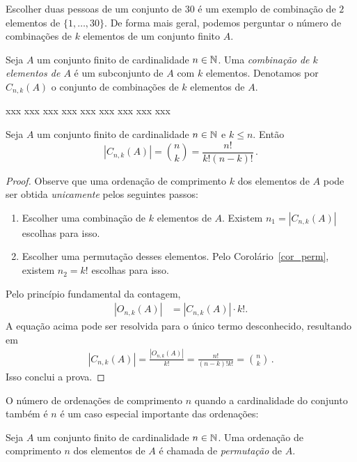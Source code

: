 Escolher duas pessoas de um conjunto de 30 é um exemplo de combinação de $2$ elementos de $\{1,\dots,30\}$. De forma mais geral, podemos perguntar o número de combinações de $k$ elementos de um conjunto finito $A$.

\begin{definição}
Seja $A$ um conjunto finito de cardinalidade $n \in \mathbb{N}$. Uma \emph{combinação de $k$ elementos de $A$} é um subconjunto de $A$ com $k$ elementos. Denotamos por $C_{n,k}(A)$ o conjunto de combinações de $k$ elementos de $A$.
\end{definição}

xxx
xxx
xxx
xxx
xxx
xxx
xxx
xxx
xxx

\begin{proposition}
Seja $A$ um conjunto finito de cardinalidade $n \in \mathbb{N}$ e $k \leq n$. Então
\begin{equation}
|C_{n,k}(A)| = \binom{n}{k} = \frac{n!}{k!(n-k)!} \,.
\end{equation}
\end{proposition}
\begin{proof}
Observe que uma ordenação de comprimento $k$ dos elementos de $A$ pode ser obtida \emph{unicamente} pelos seguintes passos:
\begin{enumerate}[noitemsep]
\item Escolher uma combinação de $k$ elementos de $A$. Existem $n_1 = |C_{n,k}(A)|$ escolhas para isso.
\item Escolher uma permutação desses elementos. Pelo Corolário~\ref{cor_perm}, existem $n_2 = k!$ escolhas para isso.
\end{enumerate}
Pelo princípio fundamental da contagem,
\begin{align}
|O_{n,k}(A)| &= |C_{n,k}(A)| \cdot k!.
\end{align}
A equação acima pode ser resolvida para o único termo desconhecido, resultando em
\begin{align}
|C_{n,k}(A)| = \frac{|O_{n,k}(A)|}{k!} = \frac{n!}{(n-k)!k!} = \binom{n}{k} \,.
\end{align}
Isso conclui a prova.
\end{proof}

O número de ordenações de comprimento $n$ quando a cardinalidade do conjunto também é $n$ é um caso especial importante das ordenações:

\begin{definition}
Seja $A$ um conjunto finito de cardinalidade $n \in \mathbb{N}$.
Uma ordenação de comprimento $n$ dos elementos de $A$ é chamada de \emph{permutação} de $A$.
\end{definition}

